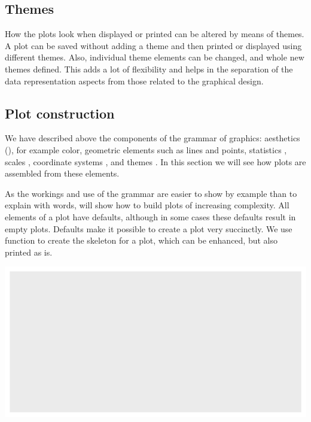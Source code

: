 \documentclass[krantz2]{krantz}\usepackage{knitr}
\begin{document}
\subsection{Themes}

How the plots look when displayed or printed can be altered by means of themes. A plot can be saved without adding a theme and then printed or displayed using different themes. Also, individual theme elements can be changed, and whole new themes defined. This adds a lot of flexibility and helps in the separation of the data representation aspects from those related to the graphical design.

\subsection{Plot construction}
We have described above the components of the grammar of graphics: aesthetics (), for example color, geometric elements  such as lines and points, statistics , scales , coordinate systems , and themes . In this section we will see how plots are assembled from these elements.

As the workings and use of the grammar are easier to show by example than to explain with words, will show how to build plots of increasing complexity. All elements of a plot have defaults, although in some cases these defaults result in empty plots. Defaults make it possible to create a plot very succinctly. We use function  to create the skeleton for a plot, which can be enhanced, but also printed as is.

\begin{knitrout}\footnotesize
{}\color{fgcolor}\begin{kframe}
\begin{alltt}
\hlstd{()}
\end{alltt}
\end{kframe}

{\centering \includegraphics[width=.7\textwidth]{figure/pos-ggplot-basics-01-1}

}



\end{knitrout}
\end{document}
